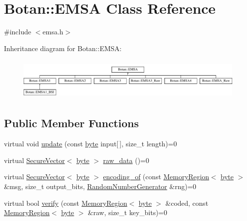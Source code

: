 \hypertarget{classBotan_1_1EMSA}{\section{Botan\-:\-:E\-M\-S\-A Class Reference}
\label{classBotan_1_1EMSA}
}


{\ttfamily \#include $<$emsa.\-h$>$}

Inheritance diagram for Botan\-:\-:E\-M\-S\-A\-:\begin{figure}[H]
\begin{center}
\leavevmode
\includegraphics[height=2.121212cm]{classBotan_1_1EMSA}
\end{center}
\end{figure}
\subsection*{Public Member Functions}
\begin{DoxyCompactItemize}
\item 
virtual void \hyperlink{classBotan_1_1EMSA_a98fe587cf5efb2cb4d98fb308bd2c6f3}{update} (const \hyperlink{namespaceBotan_a7d793989d801281df48c6b19616b8b84}{byte} input\mbox{[}$\,$\mbox{]}, size\-\_\-t length)=0
\item 
virtual \hyperlink{classBotan_1_1SecureVector}{Secure\-Vector}$<$ \hyperlink{namespaceBotan_a7d793989d801281df48c6b19616b8b84}{byte} $>$ \hyperlink{classBotan_1_1EMSA_ab639f2052ba36dc665b0e987f5428586}{raw\-\_\-data} ()=0
\item 
virtual \hyperlink{classBotan_1_1SecureVector}{Secure\-Vector}$<$ \hyperlink{namespaceBotan_a7d793989d801281df48c6b19616b8b84}{byte} $>$ \hyperlink{classBotan_1_1EMSA_a38f33f7c70298ff8da1d0e82e674503f}{encoding\-\_\-of} (const \hyperlink{classBotan_1_1MemoryRegion}{Memory\-Region}$<$ \hyperlink{namespaceBotan_a7d793989d801281df48c6b19616b8b84}{byte} $>$ \&msg, size\-\_\-t output\-\_\-bits, \hyperlink{classBotan_1_1RandomNumberGenerator}{Random\-Number\-Generator} \&rng)=0
\item 
virtual bool \hyperlink{classBotan_1_1EMSA_ac8462800c17e8e81bcd99dbf79337d3a}{verify} (const \hyperlink{classBotan_1_1MemoryRegion}{Memory\-Region}$<$ \hyperlink{namespaceBotan_a7d793989d801281df48c6b19616b8b84}{byte} $>$ \&coded, const \hyperlink{classBotan_1_1MemoryRegion}{Memory\-Region}$<$ \hyperlink{namespaceBotan_a7d793989d801281df48c6b19616b8b84}{byte} $>$ \&raw, size\-\_\-t key\-\_\-bits)=0
\end{DoxyCompactItemize}


